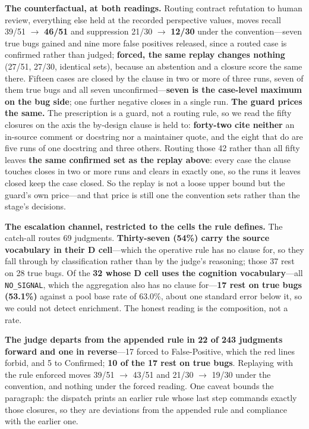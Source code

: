 \documentclass[acmsmall,screen,review,anonymous]{acmart}
\begin{document}
\textbf{The counterfactual, at both readings.} Routing contract refutation to human review,
everything else held at the recorded perspective values, moves recall 39/51 $\to$ \textbf{46/51} and
suppression 21/30 $\to$ \textbf{12/30} under the convention---seven true bugs gained and nine more
false positives released, since a routed case is confirmed rather than judged; \textbf{forced, the
same replay changes nothing} (27/51, 27/30, identical sets), because an abstention and a closure score
the same there. Fifteen cases are closed by the clause in two or more of three runs, seven of them
true bugs and all seven unconfirmed---\textbf{seven is the case-level maximum on the bug side}; one
further negative closes in a single run. \textbf{The guard prices the same.} The prescription is a
guard, not a routing rule, so we read the fifty closures on the axis the by-design clause is held to:
\textbf{forty-two cite neither} an in-source comment or docstring nor a maintainer quote, and the
eight that do are five runs of one docstring and three others. Routing those 42 rather than all
fifty leaves \textbf{the same confirmed set as the replay above}: every case the clause touches
closes in two or more runs and clears in exactly one, so the runs it leaves closed keep the case
closed. So the replay is not a loose upper bound but the guard's own price---and that price is still one
the convention sets rather than the stage's decisions.

\textbf{The escalation channel, restricted to the cells the rule defines.} The catch-all routes 69
judgments. \textbf{Thirty-seven (54\%) carry the source vocabulary in their D cell}---which the
operative rule has no clause for, so they fall through by classification rather than by the judge's
reasoning; those 37 rest on 28 true bugs. Of the \textbf{32 whose D cell uses the cognition
vocabulary}---all \texttt{NO\_SIGNAL}, which the aggregation also has no clause for---\textbf{17 rest
on true bugs (53.1\%)} against a pool base rate of 63.0\%, about one standard error below it, so we
could not detect enrichment. The honest reading is the composition, not a rate.

\textbf{The judge departs from the appended rule in 22 of 243 judgments forward and one in
reverse}---17 forced to False-Positive, which the red lines forbid, and 5 to Confirmed; \textbf{10
of the 17 rest on true bugs}. Replaying with the rule enforced moves 39/51 $\to$ 43/51 and 21/30
$\to$ 19/30 under the convention, and nothing under the forced reading. One caveat bounds the
paragraph: the dispatch prints an earlier rule whose last step commands exactly those closures, so
they are deviations from the appended rule and compliance with the earlier one.
\end{document}
